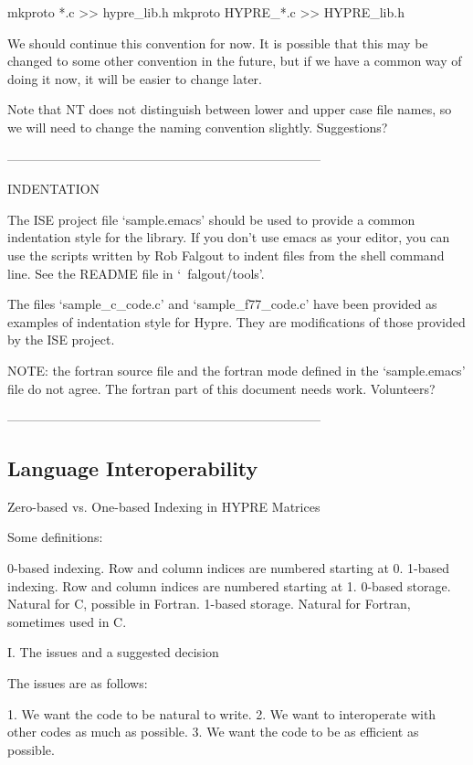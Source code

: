   mkproto *.c >> hypre_lib.h
  mkproto HYPRE_*.c >> HYPRE_lib.h

We should continue this convention for now.  It is possible that this
may be changed to some other convention in the future, but if we have
a common way of doing it now, it will be easier to change later.

Note that NT does not distinguish between lower and upper case file
names, so we will need to change the naming convention slightly.
Suggestions?

--------------------------------------------------------------------------

INDENTATION

  The ISE project file `sample.emacs' should be used to provide a
  common indentation style for the library.  If you don't use emacs
  as your editor, you can use the scripts written by Rob Falgout
  to indent files from the shell command line.  See the README file
  in `~falgout/tools'.

  The files `sample_c_code.c' and `sample_f77_code.c' have been
  provided as examples of indentation style for Hypre.  They are
  modifications of those provided by the ISE project.

  NOTE: the fortran source file and the fortran mode defined in
  the `sample.emacs' file do not agree.  The fortran part of this
  document needs work.  Volunteers?

--------------------------------------------------------------------------

\subsection{Language Interoperability}

       Zero-based vs. One-based Indexing in HYPRE Matrices


Some definitions:

0-based indexing.  Row and column indices are numbered starting at 0.
1-based indexing.  Row and column indices are numbered starting at 1.
0-based storage.   Natural for C, possible in Fortran.
1-based storage.   Natural for Fortran, sometimes used in C.


I. The issues and a suggested decision

The issues are as follows:

 1. We want the code to be natural to write.
 2. We want to interoperate with other codes as much as possible.
 3. We want the code to be as efficient as possible.

